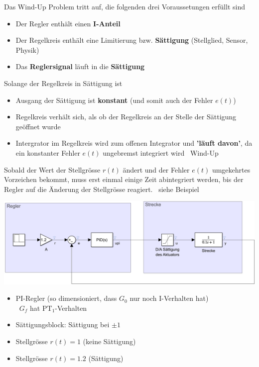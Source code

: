 Das Wind-Up Problem tritt auf, die folgenden drei Voraussetungen erfüllt sind

\begin{itemize}
    \item Der Regler enthält einen \textbf{I-Anteil}
    \item Der Regelkreis enthält eine Limitierung bzw. \textbf{Sättigung} (Stellglied, Sensor, Physik)
    \item Das \textbf{Reglersignal} läuft in die \textbf{Sättigung}
\end{itemize}

\vspace{0.2cm}
Solange der Regelkreis in Sättigung ist

\begin{itemize}
    \item Ausgang der Sättigung ist \textbf{konstant} (und somit auch der Fehler $e(t)$)
    \item Regelkreis verhält sich, als ob der Regelkreis an der Stelle der Sättigung geöffnet wurde
    \item Intergrator im Regelkreis wird zum offenen Integrator und \textbf{'läuft davon'}, da ein konstanter Fehler $e(t)$ ungebremst
        integriert wird \textrightarrow\ Wind-Up
\end{itemize}

\vspace{0.2cm}
Sobald der Wert der Stellgrösse $r(t)$ ändert und der Fehler $e(t)$ umgekehrtes Vorzeichen bekommt, muss erst einmal einige Zeit
abintegriert werden, bis der Regler auf die Änderung der Stellgrösse reagiert. \textrightarrow\ siehe Beispiel



\begin{minipage}[c]{0.48\columnwidth}
    \includegraphics[width=\columnwidth]{images/windup_beispiel.png}
\end{minipage}
\hfill
\begin{minipage}[c]{0.48\columnwidth}
    \begin{itemize}
        \item PI-Regler (so dimensioniert, dass $G_0$ nur noch I-Verhalten hat) \\
            \textrightarrow\ $G_f$ hat $\text{PT}_1$-Verhalten
        \item Sättigungsblock: Sättigung bei $\pm 1$
        \item Stellgrösse $r(t) = 1$ (keine Sättigung)
        \item Stellgrösse $r(t) = 1.2$ (Sättigung)
    \end{itemize}
\end{minipage}

